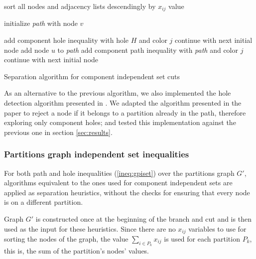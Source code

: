 \begin{algorithm}
\label{alg:sep:ciset}

\begin{algorithmic}

\STATE sort all nodes and adjacency lists descendingly by $x_{ij}$ value
 
	\STATE initialize \textit{path} with node $v$

	\LOOP
					\STATE add component hole inequality with hole $H$ and color $j$
					\STATE continue with next initial node
				\ENDIF
			\ELSE
				\STATE add node $u$ to \textit{path}	
					\STATE add component path inequality with \textit{path} and color $j$
					\STATE continue with next initial node
				\ENDIF
			\ENDIF
		\ENDFOR
	\ENDLOOP
\ENDFOR

\ENDFOR

\caption{Separation algorithm for component independent set cuts}

\end{algorithmic}
\end{algorithm}

As an alternative to the previous algorithm, we also implemented the hole detection algorithm presented in \cite{nikolopoulos2004hole}. We adapted the algorithm presented in the paper to reject a node if it belongs to a partition already in the path, therefore exploring only component holes; and tested this implementation against the previous one in section \ref{sec:results}.

\subsubsection*{Partitions graph independent set inequalities}

For both path and hole inequalities (\ref{ineq:gpiset}) over the partitions graph $G'$, algorithms equivalent to the ones used for component independent sets are applied as separation heuristics, without the checks for ensuring that every node is on a different partition.

Graph $G'$ is constructed once at the beginning of the branch and cut and is then used as the input for these heuristics. Since there are no $x_{ij}$ variables to use for sorting the nodes of the graph, the value $\sum_{i \in P_k} x_{ij}$ is used for each partition $P_k$, this is, the sum of the partition's nodes' values.

